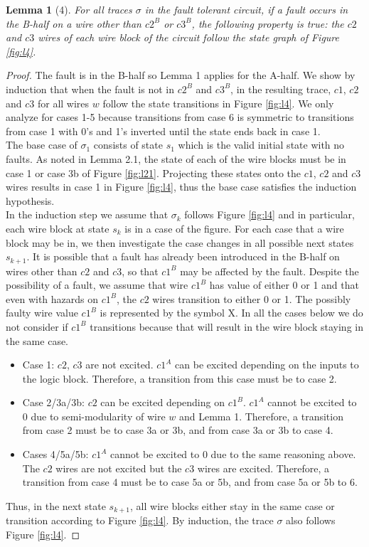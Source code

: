 \documentclass[12pt]{report}
\newtheorem*{lemma}{Lemma}
\begin{document}
\begin{lemma}[4]
For all traces $\sigma$ in the fault tolerant circuit, if a fault occurs in the B-half on a wire other than $c2^B$ or $c3^B$, the following property is true: the $c2$ and $c3$ wires of each wire block of the circuit follow the state graph of Figure \ref{fig:l4}.
\end{lemma}
\begin{proof}
The fault is in the B-half so Lemma 1 applies for the A-half.  We show by induction that when the fault is not in $c2^B$ and $c3^B$, in the resulting trace, $c1$, $c2$ and $c3$ for all wires $w$ follow the state transitions in Figure \ref{fig:l4}.  We only analyze for cases 1-5 because transitions from case 6 is symmetric to transitions from case 1 with 0's and 1's inverted until the state ends back in case 1.\\

The base case of $\sigma_1$ consists of state $s_1$ which is the valid initial state with no faults.  As noted in Lemma 2.1, the state of each of the wire blocks must be in case 1 or case 3b of Figure \ref{fig:l21}.  Projecting these states onto the $c1$, $c2$ and $c3$ wires results in case 1 in Figure \ref{fig:l4}, thus the base case satisfies the induction hypothesis.\\

In the induction step we assume that $\sigma_k$ follows Figure \ref{fig:l4} and in particular, each wire block at state $s_k$ is in a case of the figure.  For each case that a wire block may be in, we then investigate the case changes in all possible next states $s_{k+1}$.  It is possible that a fault has already been introduced in the B-half on wires other than $c2$ and $c3$, so that $c1^B$ may be affected by the fault.  Despite the possibility of a fault, we assume that wire $c1^B$ has value of either 0 or 1 and that even with hazards on $c1^B$, the $c2$ wires transition to either 0 or 1.  The possibly faulty wire value $c1^B$ is represented by the symbol X.  In all the cases below we do not consider if $c1^B$ transitions because that will result in the wire block staying in the same case.
\begin{itemize}
	\item
Case 1:  $c2$, $c3$ are not excited.  $c1^A$ can be excited depending on the inputs to the logic block.  Therefore, a transition from this case must be to case 2.
\item
Case 2/3a/3b:  $c2$ can be excited depending on $c1^B$.  $c1^A$ cannot be excited to 0 due to semi-modularity of wire $w$ and Lemma 1.  Therefore, a transition from case 2 must be to case 3a or 3b, and from case 3a or 3b to case 4.
\item
Cases 4/5a/5b:  $c1^A$ cannot be excited to 0 due to the same reasoning above.  The $c2$ wires are not excited but the $c3$ wires are excited.  Therefore, a transition from case 4 must be to case 5a or 5b, and from case 5a or 5b to 6.
\end{itemize}
Thus, in the next state $s_{k+1}$, all wire blocks either stay in the same case or transition according to Figure \ref{fig:l4}.  
By induction, the trace $\sigma$ also follows Figure \ref{fig:l4}.  
\end{proof}
\end{document}
